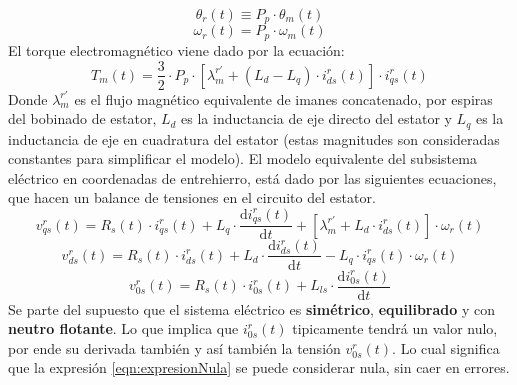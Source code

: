 \documentclass[10pt]{article}
\begin{document}
\begin{enumerate}
\begin{itemize}
\begin{equation}
		\end{equation}
		\begin{equation}
			\theta_{r} \left ( t \right ) \equiv P_{p} \cdot \theta_{m} \left ( t \right )
		\end{equation}
		\begin{equation}
			\omega_{r}\left ( t \right )=P_{p}\cdot \omega_{m}\left ( t \right )
		\end{equation}
		El torque electromagnético viene dado por la ecuación:
		\begin{equation}
			\label{sist:electromagnetico}
			T_{m}\left ( t \right )=\frac{3}{2} \cdot P_{p} \cdot \left [ \lambda_{m}^{r'}+\left ( L_{d}-L_{q} \right )\cdot i_{ds}^{r} \left ( t \right ) \right ] \cdot i_{qs}^{r}\left ( t \right )
		\end{equation}
		Donde $\lambda_{m}^{r'}$ es el flujo magnético equivalente de imanes concatenado, por espiras del bobinado de estator,
		$L_{d}$ es la inductancia de eje directo del estator y $L_{q}$ es la inductancia de eje en cuadratura del estator (estas magnitudes son consideradas constantes para simplificar el modelo).
		El modelo equivalente del subsistema eléctrico en coordenadas de entrehierro, está dado por las siguientes ecuaciones, que hacen un balance de tensiones en el circuito del estator.
		\begin{equation}
			\label{sist:electrico1}
			v_{qs}^{r}\left ( t \right )=R_{s}\left ( t \right )\cdot i_{qs}^{r}\left ( t \right )+L_{q}\cdot \frac{\mathrm{d} i_{qs}^{r}\left ( t \right )}{\mathrm{d} t}+\left [ \lambda_{m}^{r'}+L_{d}\cdot i_{ds}^{r}\left ( t \right ) \right ]\cdot \omega_{r}\left ( t \right )
		\end{equation}
		\begin{equation}
			\label{sist:electrico2}
			v_{ds}^{r}\left ( t \right )=R_{s}\left ( t \right )\cdot i_{ds}^{r}\left ( t \right )+L_{d}\cdot \frac{\mathrm{d} i_{ds}^{r}\left ( t \right )}{\mathrm{d} t}-L_{q}\cdot i_{qs}^{r}\left ( t \right )\cdot \omega_{r}\left ( t \right )
		\end{equation}
		\begin{equation}
			\label{eqn:expresionNula}
			v_{0s}^{r}\left ( t \right )=R_{s}\left ( t \right )\cdot i_{0s}^{r}\left ( t \right )+L_{ls}\cdot \frac{\mathrm{d} i_{0s}^{r}\left ( t \right )}{\mathrm{d} t}
		\end{equation}
		Se parte del supuesto que el sistema eléctrico es \textbf{simétrico}, \textbf{equilibrado} y con \textbf{neutro flotante}. Lo que implica que $i_{0s}^{r}(t)$ tipicamente tendrá un valor nulo, por ende su derivada también y así también la tensión $v_{0s}^{r}(t)$.
		Lo cual significa que la expresión \ref{eqn:expresionNula} se puede considerar nula, sin caer en errores.
		

\end{itemize}
\end{enumerate}
\end{document}
